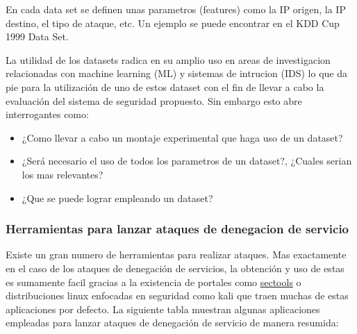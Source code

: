 \documentclass[12pt]{article}
\begin{document}
En cada data set se definen unas parametros (features) como la IP origen, la IP destino, el tipo de ataque, etc. Un ejemplo se puede encontrar en el KDD Cup 1999 Data Set\citep{kdd_desc, CIDDS-001}.

La utilidad de los datasets radica en su amplio uso en areas de investigacion relacionadas con machine learning (ML) y sistemas de intrucion (IDS) \citep{using_kdd} lo que da pie para la utilización de uno de estos dataset con el fin de llevar a cabo la evaluación del sistema de seguridad propuesto. Sin embargo esto abre interrogantes como:
\begin{itemize}
\item ¿Como llevar a cabo un montaje experimental que haga uso de un dataset?
\item ¿Será necesario el uso de todos los parametros de un dataset?, ¿Cuales serian los mas relevantes? 
\item ¿Que se puede lograr empleando un dataset?
\end{itemize}

\subsubsection{Herramientas para lanzar ataques de denegacion de servicio}

Existe un gran numero de herramientas para realizar ataques. Mas exactamente en el caso de los ataques de denegación de servicios, la obtención y uso de estas es sumamente facil gracias a la existencia de portales como \href{http://sectools.org/}{sectools} o distribuciones linux enfocadas en seguridad como kali que traen muchas de estas aplicaciones por defecto. La siguiente tabla \citep{dos_tools} muestran algunas aplicaciones empleadas para lanzar ataques de denegación de servicio de manera resumida:
\end{document}
